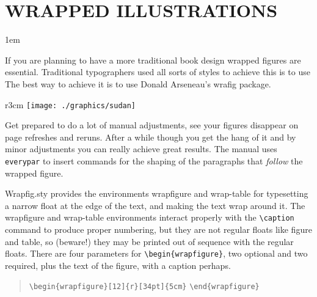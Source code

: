 \chapter{WRAPPED ILLUSTRATIONS}
\parindent1em

If you are planning to have a more traditional book design wrapped figures are essential. Traditional typographers used
all sorts of styles to achieve this is to use
The best way to achieve it is to use Donald Arseneau's wrafig package.

\begin{wrapfigure}{r}{3cm}
    \texttt{[image: ./graphics/sudan]}
    \caption{\footnotesize Wrapped figures}
\end{wrapfigure}

Get prepared to do a lot of manual adjustments, see your figures disappear on page refreshes and reruns. After a while though you get the hang of it and by minor adjustments you can really achieve great results. The manual uses \verb+everypar+ to insert commands for the shaping of the paragraphs that \emph{follow} the wrapped figure.

Wrapﬁg.sty provides the environments wrapfigure and wrap-table for typesetting a
narrow float at the edge of the text, and making the text wrap around it. The wrapfigure
and wrap-table environments interact properly with the \verb+\caption+ command to produce
proper numbering, but they are not regular ﬂoats like figure and table, so (beware!)
they may be printed out of sequence with the regular ﬂoats. There are four parameters
for \verb+\begin{wrapfigure}+, two optional and two required, plus the text of the figure, with
a caption perhaps.

\begin{quote}
  \verb+\begin{wrapfigure}[12]{r}[34pt]{5cm}+  \verb+\end{wrapfigure}+\\
\end{quote}

